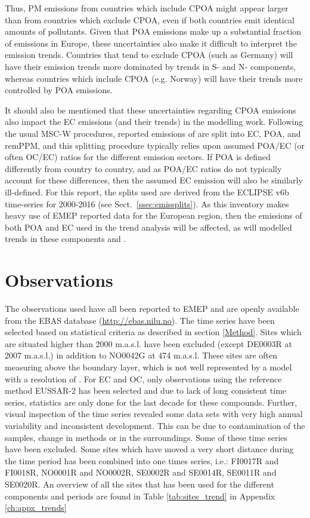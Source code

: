 Thus, PM emissions from countries which include CPOA might appear
larger than from countries which exclude CPOA, even if both countries
emit identical amounts of pollutants. Given that POA emissions make up a
substantial fraction of \pmfine emissions in Europe, these uncertainties
also make it difficult to interpret the emission trends. Countries that
tend to exclude CPOA (such as Germany) will have their \pmfine emission
trends more dominated by trends in S- and N- components, whereas countries
which include CPOA (e.g. Norway) will have their trends more controlled
by POA emissions.


It should also be mentioned that these uncertainties regarding CPOA
emissions also impact the EC emissions (and their trends) in the
modelling work. Following the usual MSC-W procedures, reported emissions
of \pmfine are split into EC, POA, and remPPM, and this splitting
procedure typically relies upon assumed POA/EC (or often OC/EC) ratios for the different
emission sectors. If POA is defined differently from country to country,
and as POA/EC ratios do not typically account for these differences,
then the assumed EC emission will also be similarly ill-defined. For this report, the
splits used are derived from the ECLIPSE v6b time-series for 2000-2016
(see Sect.~\ref{ssec:emissplits}). As this inventory makes heavy use of
EMEP reported data for the European region, then the emissions of both POA and EC used in the trend analysis will be affected, as will modelled trends in these components and \pmfine.


\section{\label{OBSTrends}{Observations}}
The observations used have all been reported to EMEP and are openly available from the EBAS database (\url{http://ebas.nilu.no}). The time series have been selected based on statistical criteria as described in section  \ref{Method}. Sites which are situated higher than 2000 m.a.s.l. have been excluded (except DE0003R at 2007 m.a.s.l.) in addition to NO0042G at 474 m.a.s.l. These sites are often measuring above the boundary layer, which is not well represented by a model with a resolution of \resZO. For EC and OC, only observations using the reference method EUSSAR-2 \citep{Cavalli:EUSAAR} has been selected and due to lack of long consistent time series, statistics are only done for the last decade for these compounds. Further, visual inspection of the time series revealed some data sets with very high annual variability and inconsistent development. This can be due to contamination of the samples, change in methods or in the surroundings. Some of these time series have been excluded. Some sites which have moved a very short distance during the time period has been combined into one times series, i.e.: FI0017R and FI0018R, NO0001R and NO0002R, SE0002R and SE0014R, SE0011R and SE0020R. An overview of all the sites that has been used for the different components and periods are found in Table \ref{tab:sites_trend} in Appendix \ref{ch:appx_trends}

